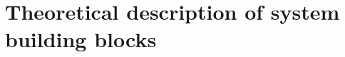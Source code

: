 \documentclass[fleqn,a4paper,12pt]{report}
\begin{document}







%
%
%
%

%

\chapter{ Theoretical description of system building blocks}

%
%
%
%
%



\begingroup
\raggedright


\endgroup
\end{document}
